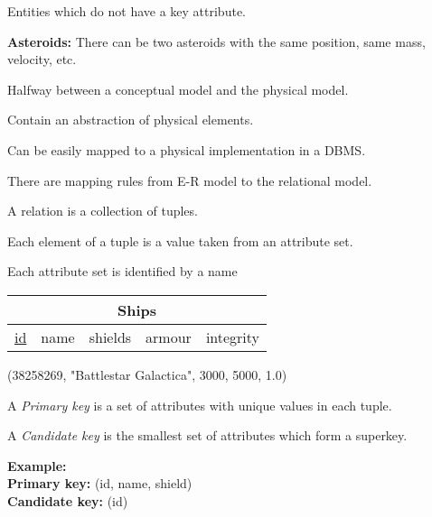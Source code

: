 \documentclass{beamer}
\begin{document}
\begin{slide}{
\item Entities which do not have a key attribute.
\item \textbf{Asteroids:} There can be two asteroids with the same position, same mass, velocity, etc.

}\end{slide}

\begin{slide}{
\item Halfway between a conceptual model and the physical model.
\item Contain an abstraction of physical elements.
\item Can be easily mapped to a physical implementation in a DBMS.
\item There are mapping rules from E-R model to the relational model.
}\end{slide}

\begin{slide}{
\item A relation is a collection of tuples.
\item Each element of a tuple is a value taken from an attribute set.
\item Each attribute set is identified by a name

\vspace{0.5cm}
\centering
\begin{tabular}{|c|c|c|c|c|}
\hline
\multicolumn{5}{|c|}{\textbf{Ships}} \\
\hline
\underline{id} & name & shields & armour & integrity \\
\hline
\end{tabular}

\vspace{0.5cm}
(38258269, "Battlestar Galactica", 3000, 5000, 1.0)
}\end{slide}

\begin{slide}{
\item A \textit{Primary key} is a set of attributes with unique values in each tuple.
\item A \textit{Candidate key} is the smallest set of attributes which form a superkey.

\vspace{0.5cm}
\textbf{Example:}\\
\textbf{Primary key:} (id, name, shield) \\
\textbf{Candidate key:} (id)
}\end{slide}
\end{document}
